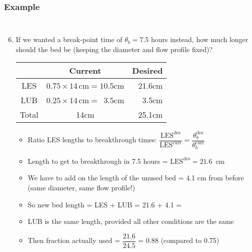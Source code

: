 \begin{frame}\frametitle{Example}
	\vspace{-12pt}
	\begin{columns}[t]
		\begin{enumerate}
			\setcounter{enumi}{5}

			\item	If we wanted a break-point time of $\theta_b = 7.5$ hours instead, how much longer should the bed be {\small (keeping the diameter and flow profile fixed)}?
			
			\begin{center}
				\begin{tabular}{c||c|r}
							&	\textbf{Current}			& \textbf{Desired} \\ \hline
					LES		&	$0.75 \times 14\,\text{cm} = 10.5$cm	&	21.6cm \\
					LUB 	&	$0.25 \times 14\,\text{cm} = \,\,\,3.5$cm	&	3.5cm\\ \hline
					Total 	&	14cm						&   25.1cm\\
				\end{tabular}
			\end{center}
			
			\begin{itemize}
				\item	Ratio LES lengths to breakthrough times: $ \dfrac{\text{LES}^\text{des}}{\text{LES}^\text{curr}} =  \dfrac{\theta_b^\text{des}}{\theta_b^\text{curr}}$
				\item	Length to get to breakthrough in 7.5 hours = $\text{LES}^\text{des} = 21.6$~cm
				\item	We have to add on the length of the unused bed = 4.1 cm from before (same diameter, same flow profile!)
				\item	So new bed length = LES + LUB = 21.6 + 4.1  = {\color{myOrange}{25.1 cm}}
				\item	LUB is the same length, provided all other conditions are the same
				\item	Then fraction actually used = $\dfrac{21.6}{24.5}$ = 0.88 {\scriptsize (compared to 0.75)}
			\end{itemize}
		\end{enumerate}
	\end{columns}
\end{frame}

